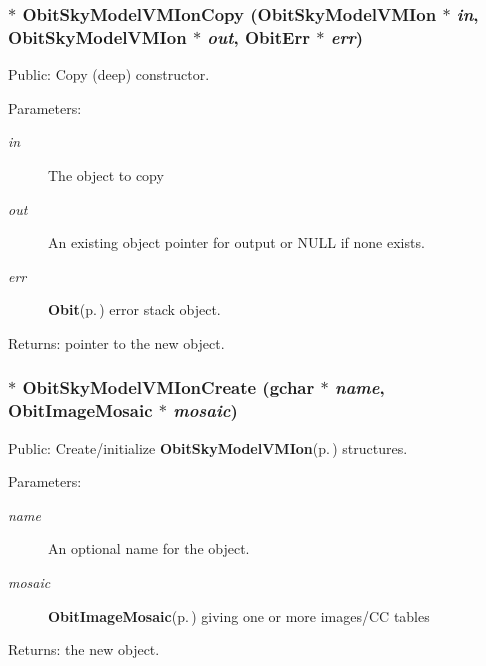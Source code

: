 \subsubsection{$\ast$ Obit\-Sky\-Model\-VMIon\-Copy ({\bf Obit\-Sky\-Model\-VMIon} $\ast$ {\em in}, {\bf Obit\-Sky\-Model\-VMIon} $\ast$ {\em out}, {\bf Obit\-Err} $\ast$ {\em err})}\label{ObitSkyModelVMIon_8c_a10}


Public: Copy (deep) constructor. 

\begin{Desc}
\item[Parameters:]
\begin{description}
\item[{\em in}]The object to copy \item[{\em out}]An existing object pointer for output or NULL if none exists. \item[{\em err}]{\bf Obit}{\rm (p.\,\pageref{structObit})} error stack object. \end{description}
\end{Desc}
\begin{Desc}
\item[Returns:]pointer to the new object. \end{Desc}
\subsubsection{$\ast$ Obit\-Sky\-Model\-VMIon\-Create (gchar $\ast$ {\em name}, {\bf Obit\-Image\-Mosaic} $\ast$ {\em mosaic})}\label{ObitSkyModelVMIon_8c_a11}


Public: Create/initialize {\bf Obit\-Sky\-Model\-VMIon}{\rm (p.\,\pageref{structObitSkyModelVMIon})} structures. 

\begin{Desc}
\item[Parameters:]
\begin{description}
\item[{\em name}]An optional name for the object. \item[{\em mosaic}]{\bf Obit\-Image\-Mosaic}{\rm (p.\,\pageref{structObitImageMosaic})} giving one or more images/CC tables \end{description}
\end{Desc}
\begin{Desc}
\item[Returns:]the new object. \end{Desc}
